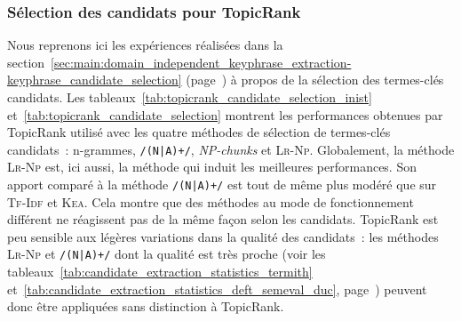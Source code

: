       \subsubsection{Sélection des candidats pour TopicRank}
      \label{subsubsec:main:domain_independent_keyphrase_extraction-unsupervised_automatic_keyphrase_extraction-evaluation-candidate_selection}
        Nous reprenons ici les expériences réalisées dans la
        section~\ref{sec:main:domain_independent_keyphrase_extraction-keyphrase_candidate_selection}
        (page~\pageref{sec:main:domain_independent_keyphrase_extraction-keyphrase_candidate_selection})
        à propos de la sélection des termes-clés candidats. Les
        tableaux~\ref{tab:topicrank_candidate_selection_inist}
        et~\ref{tab:topicrank_candidate_selection} montrent les performances
        obtenues par TopicRank utilisé avec les quatre méthodes de sélection de
        termes-clés candidats~: n-grammes, \texttt{/(N|A)+/}, \textit{NP-chunks}
        et \textsc{Lr-Np}. Globalement, la méthode \textsc{Lr-Np} est, ici
        aussi, la méthode qui induit les meilleures performances. Son apport
        comparé à la méthode \texttt{/(N|A)+/} est tout de même plus modéré que
        sur \textsc{Tf-Idf} et \textsc{Kea}. Cela montre que des méthodes au
        mode de fonctionnement différent ne réagissent pas de la même façon
        selon les candidats. TopicRank est peu sensible aux légères variations dans la
        qualité des candidats~: les méthodes \textsc{Lr-Np} et \texttt{/(N|A)+/}
        dont la qualité est très proche (voir les
        tableaux~\ref{tab:candidate_extraction_statistics_termith}
        et~\ref{tab:candidate_extraction_statistics_deft_semeval_duc},
        page~\pageref{tab:candidate_extraction_statistics_termith}) peuvent donc
        être appliquées sans distinction à TopicRank.
